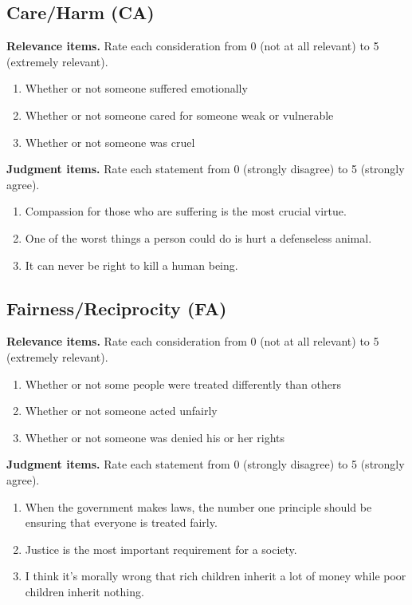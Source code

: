 \subsection*{Care/Harm (CA)}
\textbf{Relevance items.} Rate each consideration from 0 (not at all relevant) to 5 (extremely relevant).
\begin{enumerate}
\item[CA01] Whether or not someone suffered emotionally
\item[CA02] Whether or not someone cared for someone weak or vulnerable
\item[CA03] Whether or not someone was cruel
\end{enumerate}
\textbf{Judgment items.} Rate each statement from 0 (strongly disagree) to 5 (strongly agree).
\begin{enumerate}
\item[CA04] Compassion for those who are suffering is the most crucial virtue.
\item[CA05] One of the worst things a person could do is hurt a defenseless animal.
\item[CA06] It can never be right to kill a human being.
\end{enumerate}
\subsection*{Fairness/Reciprocity (FA)}
\textbf{Relevance items.} Rate each consideration from 0 (not at all relevant) to 5 (extremely relevant).
\begin{enumerate}
\item[FA07] Whether or not some people were treated differently than others
\item[FA08] Whether or not someone acted unfairly
\item[FA09] Whether or not someone was denied his or her rights
\end{enumerate}
\textbf{Judgment items.} Rate each statement from 0 (strongly disagree) to 5 (strongly agree).
\begin{enumerate}
\item[FA10] When the government makes laws, the number one principle should be ensuring that everyone is treated fairly.
\item[FA11] Justice is the most important requirement for a society.
\item[FA12] I think it's morally wrong that rich children inherit a lot of money while poor children inherit nothing.
\end{enumerate}
